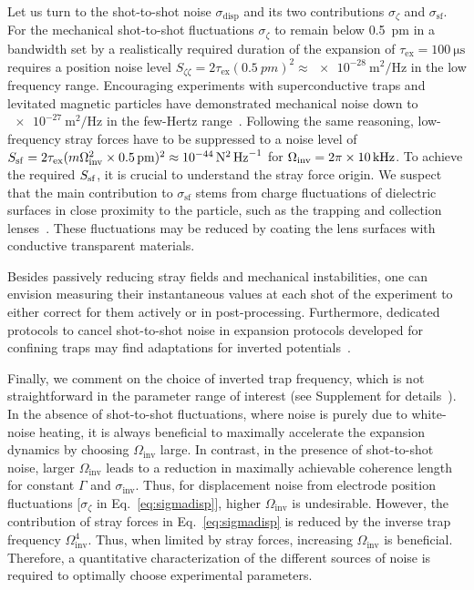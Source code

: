 \documentclass[aps,prl,reprint,twocolumn,superscriptaddress]{revtex4-2}
\begin{document}
Let us turn to the shot-to-shot noise $\sigma_{\mathrm{disp}}$ and its two contributions $\sigma_\zeta$ and $\sigma_\text{sf}$. 
For the mechanical shot-to-shot fluctuations $\sigma_\zeta$ to remain below 0.5~pm in a bandwidth set by a realistically required duration of the expansion of $\tau_\text{ex}=\SI{100}{\micro\second}$ requires a position noise level $S_{\zeta\zeta} = 2\tau_{\mathrm{ex}}(\SI{0.5}{pm})^2\approx \SI{e-28}{\meter\squared\per\hertz}$ in the low frequency range.
Encouraging experiments with superconductive traps and levitated magnetic particles have demonstrated mechanical noise down to $\SI{e-27}{\meter\squared\per\hertz}$ in the few-Hertz range~\cite{fuchs2024measuring}.
Following the same reasoning, low-frequency stray forces have to be suppressed to a noise level of $S_{\rm sf}=2\tau_{\rm ex}(m\Omega^2_{\rm inv}\times\SI{0.5}{\pico\meter})^2  \approx \SI{e-44}{\newton\squared\per\hertz}$ for $\Omega_{\rm inv}=2\pi\times\SI{10}{\kilo\hertz}$. 
To achieve the required $S_{\rm sf}$, it is crucial to understand the stray force origin. 
We suspect that the main contribution to $\sigma_\text{sf}$ stems from charge fluctuations of dielectric surfaces in close proximity to the particle, such as the trapping and collection lenses~\cite{brownnutt2015ion,teller2021heating,sagesser20243dimensional,hebestreit2018sensing}. These fluctuations may be reduced by coating the lens surfaces with conductive transparent materials.


Besides passively reducing stray fields and mechanical instabilities, one can envision measuring their instantaneous values at each shot of the experiment to either correct for them actively or in post-processing.
Furthermore, dedicated protocols to cancel shot-to-shot noise in expansion protocols developed for confining traps may find adaptations for inverted potentials~\cite{rossi2024quantum}.

Finally, we comment on the choice of inverted trap frequency, which is not straightforward in the parameter range of interest (see Supplement for details~\cite{supplement}). 
In the absence of shot-to-shot fluctuations, where noise is purely due to white-noise heating, it is always beneficial to maximally accelerate the expansion dynamics by choosing $\Omega_\text{inv}$ large. 
In contrast, in the presence of shot-to-shot noise, larger $\Omega_\text{inv}$ leads to a reduction in maximally achievable coherence length for constant $\Gamma$ and $\sigma_\text{inv}$. Thus, for displacement noise from electrode position fluctuations [$\sigma_\zeta$ in Eq.~\eqref{eq:sigmadisp}], higher $\Omega_\text{inv}$ is undesirable. 
However, the contribution of stray forces in Eq.~\eqref{eq:sigmadisp} is reduced by the inverse trap frequency $\Omega_\text{inv}^4$. Thus, when limited by stray forces, increasing $\Omega_\text{inv}$ is beneficial. 
Therefore, a quantitative characterization of the different sources of noise is required to optimally choose experimental parameters.
\end{document}
